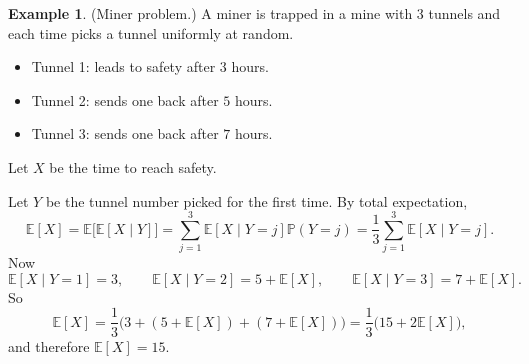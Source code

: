 \documentclass[11pt]{article}
\theoremstyle{plain}
\theoremstyle{definition}
\newtheorem{example}[theorem]{Example}
\theoremstyle{remark}
\begin{document}
	\begin{example}
		(Miner problem.)
		A miner is trapped in a mine with 3 tunnels and each time picks a tunnel uniformly at random.
		\begin{itemize}[leftmargin=2em]
			\item Tunnel 1: leads to safety after \(3\) hours.
			\item Tunnel 2: sends one back after \(5\) hours.
			\item Tunnel 3: sends one back after \(7\) hours.
		\end{itemize}
		Let \(X\) be the time to reach safety.
		
		Let \(Y\) be the tunnel number picked for the first time.
		By total expectation,
		\[
		\mathbb{E}[X]=\mathbb{E}\!\big[\mathbb{E}[X\mid Y]\big]
		=\sum_{j=1}^{3}\mathbb{E}[X\mid Y=j]\mathbb{P}(Y=j)
		=\frac{1}{3}\sum_{j=1}^{3}\mathbb{E}[X\mid Y=j].
		\]
		Now
		\[
		\mathbb{E}[X\mid Y=1]=3,
		\qquad
		\mathbb{E}[X\mid Y=2]=5+\mathbb{E}[X],
		\qquad
		\mathbb{E}[X\mid Y=3]=7+\mathbb{E}[X].
		\]
		So
		\[
		\mathbb{E}[X]=\frac{1}{3}\bigl(3+(5+\mathbb{E}[X])+(7+\mathbb{E}[X])\bigr)
		=\frac{1}{3}\bigl(15+2\mathbb{E}[X]\bigr),
		\]
		and therefore \(\mathbb{E}[X]=15\).
	\end{example}
	
\end{document}
